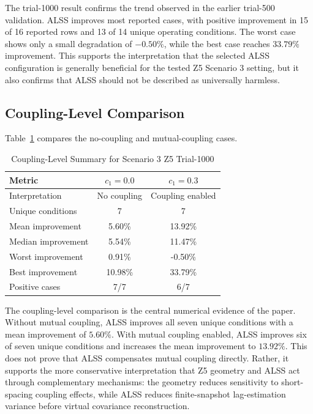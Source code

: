\documentclass[conference]{IEEEtran}
\begin{document}
The trial-1000 result confirms the trend observed in the earlier trial-500 validation. ALSS improves most reported cases, with positive improvement in 15 of 16 reported rows and 13 of 14 unique operating conditions. The worst case shows only a small degradation of $-0.50\%$, while the best case reaches $33.79\%$ improvement. This supports the interpretation that the selected ALSS configuration is generally beneficial for the tested Z5 Scenario 3 setting, but it also confirms that ALSS should not be described as universally harmless.

\subsection{Coupling-Level Comparison}

Table~\ref{tab:coupling_summary} compares the no-coupling and mutual-coupling cases.

\begin{table}[!t]
\centering
\caption{Coupling-Level Summary for Scenario 3 Z5 Trial-1000}
\label{tab:coupling_summary}
\begin{tabular}{lcc}
\toprule
Metric & $c_1=0.0$ & $c_1=0.3$ \\
\midrule
Interpretation & No coupling & Coupling enabled \\
Unique conditions & 7 & 7 \\
Mean improvement & 5.60\% & 13.92\% \\
Median improvement & 5.54\% & 11.47\% \\
Worst improvement & 0.91\% & -0.50\% \\
Best improvement & 10.98\% & 33.79\% \\
Positive cases & 7/7 & 6/7 \\
\bottomrule
\end{tabular}
\end{table}

The coupling-level comparison is the central numerical evidence of the paper. Without mutual coupling, ALSS improves all seven unique conditions with a mean improvement of $5.60\%$. With mutual coupling enabled, ALSS improves six of seven unique conditions and increases the mean improvement to $13.92\%$. This does not prove that ALSS compensates mutual coupling directly. Rather, it supports the more conservative interpretation that Z5 geometry and ALSS act through complementary mechanisms: the geometry reduces sensitivity to short-spacing coupling effects, while ALSS reduces finite-snapshot lag-estimation variance before virtual covariance reconstruction.
\end{document}
